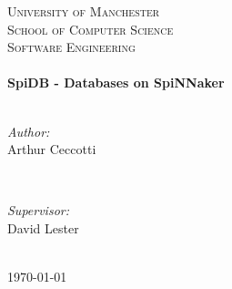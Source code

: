 \thispagestyle{empty}

{\centering

\textsc{\LARGE University of Manchester}\\[1.5cm]
\textsc{\Large School of Computer Science}\\[0.5cm]
\textsc{\large Software Engineering}\\[0.5cm]

\HRule \\[0.4cm]
{ \huge \bfseries SpiDB - Databases on SpiNNaker}\\[0.4cm]
\HRule \\[1.5cm]

\begin{minipage}{0.4\textwidth}
\begin{flushleft} \large
\emph{Author:}\\
Arthur Ceccotti
\end{flushleft}
\end{minipage}
~
\begin{minipage}{0.4\textwidth}
\begin{flushright} \large
\emph{Supervisor:} \\
David Lester
\end{flushright}
\end{minipage}\\[4cm]

{\large \today}\\[3cm]

\vfill

\par
}